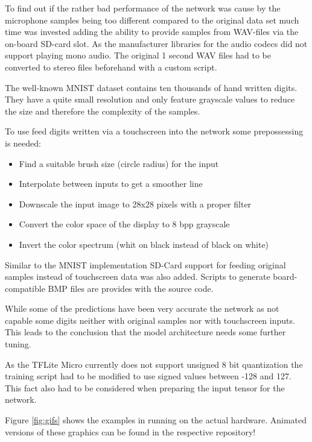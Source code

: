 \documentclass{tum-presentation}
\begin{document}
\begin{frame}
To find out if the rather bad performance of the network was cause by the microphone samples being too different compared to the original data set much time was invested adding the ability to provide samples from WAV-files via the on-board SD-card slot. As the manufacturer libraries for the audio codecs did not support playing mono audio. The original 1 second WAV files had to be converted to stereo files beforehand with a custom script.


The well-known MNIST dataset contains ten thousands of hand written digits. They have a quite small resolution and only feature grayscale values to reduce the size and therefore the complexity of the samples.

To use feed digits written via a touchscreen into the network some prepossessing is needed:

\begin{itemize}
    \item Find a suitable brush size (circle radius) for the input
    \item Interpolate between inputs to get a smoother line
    \item Downscale the input image to 28x28 pixels with  a proper filter
    \item Convert the color space of the display to 8 bpp grayscale
    \item Invert the color spectrum (whit on black instead of black on white)
\end{itemize}

Similar to the MNIST implementation SD-Card support for feeding original samples instead of touchscreen data was also added. Scripts to generate board-compatible BMP files are provides with the source code. 

While some of the predictions have been very accurate the network as not capable some digits neither with original samples nor with touchscreen inputs. This leads to the conclusion that the model architecture needs some further tuning.

As the TFLite Micro currently does not support unsigned 8 bit quantization the training script had to be modified to use signed values between -128 and 127. This fact also had to be considered when preparing the input tensor for the network.

Figure \ref{fig:gifs} shows the examples in running on the actual hardware. Animated versions of these graphics can be found in the respective repository!


\end{frame}
\end{document}
